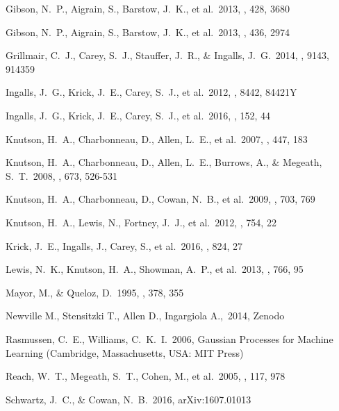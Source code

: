 \begin{thebibliography}{25}
 Gibson, N.~P., Aigrain, S., Barstow, J.~K., et al.\ 2013, \mnras, 428, 3680

 Gibson, N.~P., Aigrain, S., Barstow, J.~K., et al.\ 2013, \mnras, 436, 2974

 Grillmair, C.~J., Carey, S.~J., Stauffer, J.~R., \& Ingalls, J.~G.\ 2014, \procspie, 9143, 914359

 Ingalls, J.~G., Krick, J.~E., Carey, S.~J., et al.\ 2012, \procspie, 8442, 84421Y

 Ingalls, J.~G., Krick, J.~E., Carey, S.~J., et al.\ 2016, \aj, 152, 44

 Knutson, H.~A., Charbonneau, D., Allen, L.~E., et al.\ 2007, \nat, 447, 183

 Knutson, H.~A., Charbonneau, D., Allen, L.~E., Burrows, A., \& Megeath, S.~T.\ 2008, \apj, 673, 526-531

 Knutson, H.~A., Charbonneau, D., Cowan, N.~B., et al.\ 2009, \apj, 703, 769

 Knutson, H.~A., Lewis, N., Fortney, J.~J., et al.\ 2012, \apj, 754, 22

 Krick, J.~E., Ingalls, J., Carey, S., et al.\ 2016, \apj, 824, 27

 Lewis, N.~K., Knutson, H.~A., Showman, A.~P., et al.\ 2013, \apj, 766, 95

 Mayor, M., \& Queloz, D.\ 1995, \nat, 378, 355

 Newville M., Stensitzki T., Allen D., Ingargiola A.,\ 2014, Zenodo

 Rasmussen, C.~E., Williams, C.~K.~I.\ 2006, Gaussian Processes for Machine Learning (Cambridge, Massachusetts, USA: MIT Press)

 Reach, W.~T., Megeath, S.~T., Cohen, M., et al.\ 2005, \pasp, 117, 978

 Schwartz, J.~C., \& Cowan, N.~B.\ 2016, arXiv:1607.01013


\end{thebibliography}
